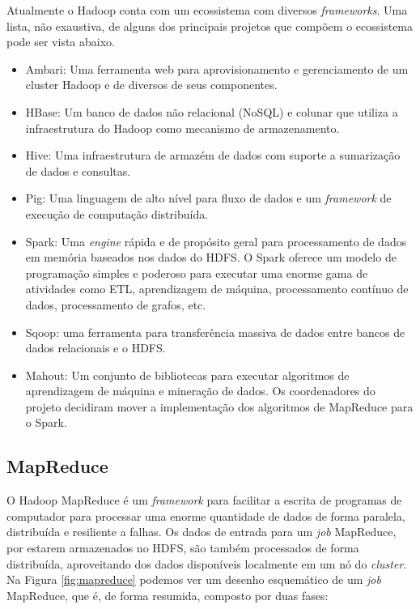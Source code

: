 Atualmente o Hadoop conta com um ecossistema com diversos \textit{frameworks}. Uma lista, não exaustiva, 
de alguns dos principais projetos que compõem o ecossistema pode ser vista abaixo.

\begin{itemize}
	\item Ambari: Uma ferramenta web para aprovisionamento e gerenciamento de um cluster Hadoop e de diversos de seus componentes.
	\item HBase: Um banco de dados não relacional (NoSQL) e colunar que utiliza a infraestrutura do Hadoop como mecanismo de armazenamento.
	\item Hive: Uma infraestrutura de armazém de dados com suporte a sumarização de dados e consultas.
	\item Pig: Uma linguagem de alto nível para fluxo de dados e um \textit{framework} de execução de computação distribuída. 
	\item Spark: Uma \textit{engine} rápida e de propósito geral para processamento de dados em memória baseados nos dados do HDFS. O Spark oferece um modelo de programação simples e poderoso para executar uma enorme gama de atividades como ETL, aprendizagem de máquina, processamento contínuo de dados, processamento de grafos, etc.
	\item Sqoop: uma ferramenta para transferência massiva de dados entre bancos de dados relacionais e o HDFS.
	\item Mahout: Um conjunto de bibliotecas para executar algoritmos de aprendizagem de máquina e mineração de dados. Os coordenadores do projeto decidiram mover a implementação dos algoritmos de MapReduce para o Spark.
\end{itemize}

\subsection{MapReduce}
\label{sec:mapreduce}

O Hadoop MapReduce é um \textit{framework} para facilitar a escrita de programas de computador para 
processar uma enorme quantidade de dados de forma paralela, distribuída e resiliente a falhas. Os dados 
de entrada para um \textit{job} MapReduce, por estarem armazenados no HDFS, são também processados 
de forma distribuída, aproveitando dos dados disponíveis localmente em um nó do \textit{cluster}. 
Na Figura \ref{fig:mapreduce} podemos ver um desenho esquemático de um \textit{job} MapReduce, que é, 
de forma resumida, composto por duas fases:

